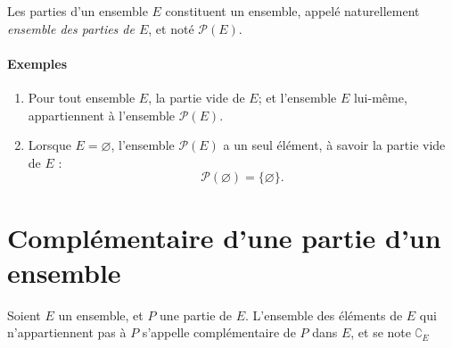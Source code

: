 \documentclass[12pt,parskip=full,chapterprefix=true,a5paper]{scrbook}
\begin{document}
Les parties d'un ensemble \(E\) constituent un ensemble, appelé naturellement \emph{ensemble des parties de \(E\)}, et noté \(\mathcal{P}(E)\).

\paragraph{Exemples}
\begin{enumerate}
\item Pour tout ensemble \(E\), la partie vide de \(E\); et l'ensemble \(E\) lui-même, appartiennent à l'ensemble \(\mathcal{P}(E)\).
\item Lorsque \(E=\varnothing\), l'ensemble \(\mathcal{P}(E)\) a un seul élément, à savoir la partie vide de \(E\) :
  \[
    \mathcal{P}(\varnothing)=\{\varnothing\}.
  \]
\end{enumerate}

\section*{Complémentaire d'une partie d'un ensemble}

Soient \(E\) un ensemble, et \(P\) une partie de \(E\). L'ensemble des éléments de \(E\) qui n'appartiennent pas à \(P\) s'appelle complémentaire de \(P\) dans \(E\), et se note \(\complement_E\)
  
\end{document}
